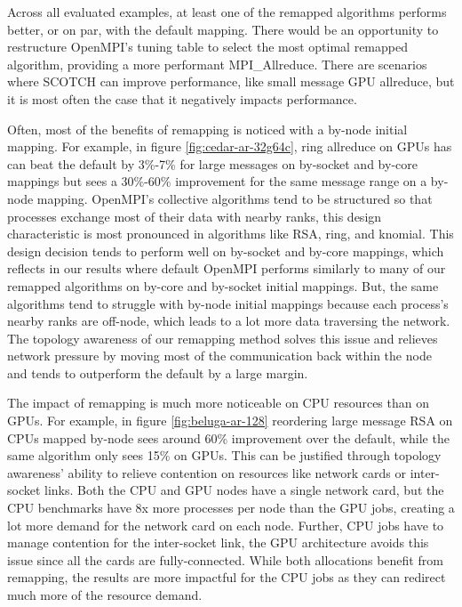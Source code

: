 





Across all evaluated examples, at least one of the remapped algorithms performs better, or on par, with the default mapping. 
There would be an opportunity to restructure OpenMPI's tuning table to select the most optimal remapped algorithm, providing a more performant MPI\_Allreduce.
There are scenarios where SCOTCH can improve performance, like small message GPU allreduce, but it is most often the case that it negatively impacts performance.

Often, most of the benefits of remapping is noticed with a by-node initial mapping. 
For example, in figure \ref{fig:cedar-ar-32g64c}, ring allreduce on GPUs has can beat the default by 3\%-7\% for large messages on by-socket and by-core mappings but sees a 30\%-60\% improvement for the same message range on a by-node mapping.
OpenMPI's collective algorithms tend to be structured so that processes exchange most of their data with nearby ranks, this design characteristic is most pronounced in algorithms like RSA, ring, and knomial.
This design decision tends to perform well on by-socket and by-core mappings, which reflects in our results where default OpenMPI performs similarly to many of our remapped algorithms on by-core and by-socket initial mappings.
But, the same algorithms tend to struggle with by-node initial mappings because each process's nearby ranks are off-node, which leads to a lot more data traversing the network.
The topology awareness of our remapping method solves this issue and relieves network pressure by moving most of the communication back within the node and tends to outperform the default by a large margin.

The impact of remapping is much more noticeable on CPU resources than on GPUs.
For example, in figure \ref{fig:beluga-ar-128} reordering large message RSA on CPUs mapped by-node sees around 60\% improvement over the default, while the same algorithm only sees 15\% on GPUs.
This can be justified through topology awareness' ability to relieve contention on resources like network cards or inter-socket links. 
Both the CPU and GPU nodes have a single network card, but the CPU benchmarks have 8x more processes per node than the GPU jobs, creating a lot more demand for the network card on each node.
Further, CPU jobs have to manage contention for the inter-socket link, the GPU architecture avoids this issue since all the cards are fully-connected.
While both allocations benefit from remapping, the results are more impactful for the CPU jobs as they can redirect much more of the resource demand.

